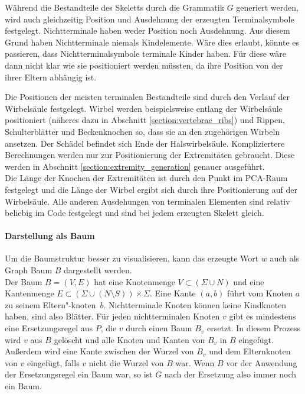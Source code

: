 Während die Bestandteile des Skeletts durch die Grammatik $G$ generiert werden, wird auch gleichzeitig Position und Ausdehnung der erzeugten Terminalsymbole festgelegt. Nichtterminale haben weder Position noch Ausdehnung. Aus diesem Grund haben Nichtterminale niemals Kindelemente. Wäre dies erlaubt, könnte es passieren, dass Nichtterminalsymbole terminale Kinder haben. Für diese wäre dann nicht klar wie sie positioniert werden müssten, da ihre Position von der ihrer Eltern abhängig ist.

Die Positionen der meisten terminalen Bestandteile sind durch den Verlauf der Wirbelsäule festgelegt. Wirbel werden beispielsweise entlang der Wirbelsäule positioniert (näheres dazu in Abschnitt \ref{section:vertebrae_ribs}) und Rippen, Schulterblätter und Beckenknochen so, dass sie an den zugehörigen Wirbeln ansetzen. Der Schädel befindet sich Ende der Halswirbelsäule. Kompliziertere Berechnungen werden nur zur Positionierung der Extremitäten gebraucht. Diese werden in Abschnitt \ref{section:extremity_generation} genauer ausgeführt.\\
Die Länge der Knochen der Extremitäten ist durch den Punkt im PCA-Raum festgelegt und die Länge der Wirbel ergibt sich durch ihre Positionierung auf der Wirbelsäule. Alle anderen Ausdehungen von terminalen Elementen sind relativ beliebig im Code festgelegt und sind bei jedem erzeugten Skelett gleich.


\paragraph{Darstellung als Baum}
Um die Baumstruktur besser zu visualisieren, kann das erzeugte Wort $w$ auch als Graph \bzw Baum $B$ dargestellt werden.\\
Der Baum $B = (V, E)$ hat eine Knotenmenge $V \subset (\Sigma \cup N)$ und eine Kantenmenge $E \subset (\Sigma \cup (N \setminus S)) \times \Sigma$. Eine Kante $(a, b)$ führt vom Knoten $a$ zu seinem Eltern"-\mbox{knoten $b$}. Nichtterminale Knoten können keine Kindknoten haben, sind also Blätter. Für jeden nichtterminalen Knoten $v$ gibt es mindestens eine Ersetzungsregel aus $P$, die $v$ durch einen Baum $B_v$ ersetzt. In diesem Prozess wird $v$ aus $B$ gelöscht und alle Knoten und Kanten von $B_v$ in $B$ eingefügt. Außerdem wird eine Kante zwischen der Wurzel von $B_v$ und dem Elternknoten von $v$ eingefügt, falls $v$ nicht die Wurzel von $B$ war. Wenn $B$ vor der Anwendung der Ersetzungsregel ein Baum war, so ist $G$ nach der Ersetzung also immer noch ein Baum.

